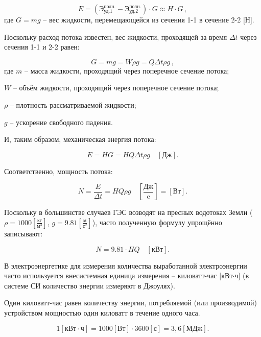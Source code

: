 $$
   E = \left( \text{Э}^{\text{полн.}}_{\text{уд.1}} - \text{Э}^{\text{полн.}}_{\text{уд.2}} \right) \cdot G \approx H \cdot G \, ,
$$ 
где $G = mg$ -- вес жидкости, перемещающейся из сечения 1-1 в сечение 2-2 [Н].

Поскольку расход потока известен, вес жидкости, проходящей за время $\Delta t$ через сечения 1-1 и 2-2 равен:

$$
   G = mg = W \rho g = Q \Delta t \rho g \, ,
$$
где $ m $ -- масса жидкости, проходящий через поперечное сечение потока;

$ W $ -- объём жидкости, проходящий через поперечное сечение потока;

$ \rho $ -- плотность рассматриваемой жидкости;

$ g $ -- ускорение свободного падения.

И, таким образом, механическая энергия потока:

$$
   E= H G = H Q \Delta t \rho g \quad \left[ \text{Дж} \right].
$$

Соответственно, мощность потока:

\begin{equation}
\label{eq_fb}
   N = \frac{E}{\Delta t} = H Q \rho g \quad \left[ \frac{\text{Дж}}{\text{c}} \right] = \left[ \text{Вт} \right].
\end{equation}

Поскольку в большинстве случаев ГЭС возводят на пресных водотоках Земли ($\rho = 1000 \left[ \frac{\text{кг}}{\text{м}^3} \right]$, $g = 9.81 \left[ \frac{\text{м}}{\text{с}^2} \right]$), часто полученную формулу упрощённо записывают:

$$
   N = 9.81\cdot H Q \quad \left[ \text{кВт} \right].
$$

\vspace{0.5cm}

В электроэнергетике для измерения количества выработанной электроэнергии часто используется внесистемная единица измерения -- киловатт-час [кВт$\cdot$ч] (в системе СИ количество энергии измеряют в Джоулях).

\begin{opred}
   Один киловатт-час равен количеству энергии, потребляемой (или производимой) устройством мощностью один киловатт в течение одного часа.
\end{opred}

$$
   1 \left[ \text{кВт} \cdot \text{ч} \right] = 1000 \left[ \text{Вт} \right] \cdot 3600 \left[ \text{с} \right] = 3,6 \left[ \text{МДж} \right].
$$


